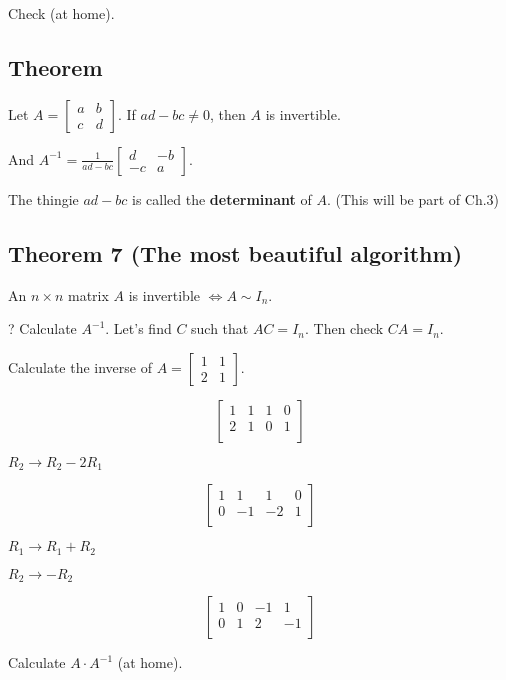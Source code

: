 \documentclass[12pt]{article}
\begin{document}
Check (at home).

\subsection{Theorem}

Let $A = \begin{bmatrix} a & b \\ c & d \end{bmatrix}$. If $ad-bc \neq 0$, then
$A$ is invertible.

And $A^{-1} = \frac{1}{ad-bc} \begin{bmatrix} d & -b \\ -c & a \end{bmatrix}$.

The thingie $ad-bc$ is called the \textbf{determinant} of $A$. (This will be
part of Ch.3)

\subsection{Theorem 7 (The most beautiful algorithm)}

An $n\times n$ matrix $A$ is invertible $\iff A \sim I_n$.

? Calculate $A^{-1}$. Let's find $C$ such that $AC=I_n$. Then check $CA=I_n$.

Calculate the inverse of $A=\begin{bmatrix} 1 & 1 \\ 2 & 1 \end{bmatrix}$.

\[
  \left[
    \begin{array}{cc|cc}
      1 & 1 & 1 & 0 \\
      2 & 1 & 0 & 1 \\
    \end{array}
  \right]
\]

$R_2 \to R_2 - 2R_1$

\[
  \left[
    \begin{array}{cc|cc}
      1 & 1 & 1 & 0 \\
      0 & -1 & -2 & 1 \\
    \end{array}
  \right]
\]

$R_1 \to R_1 + R_2$

$R_2 \to -R_2$

\[
  \left[
    \begin{array}{cc|cc}
      1 & 0 & -1 & 1 \\
      0 & 1 & 2 & -1 \\
    \end{array}
  \right]
\]

Calculate $A \cdot A^{-1}$ (at home).
\end{document}

